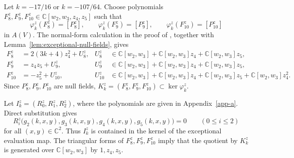 \documentclass[11 pt]{amsart}
\theoremstyle{definition}
\theoremstyle{plain}
\begin{document}
\medskip
Let $k=-17/16$ or $k=-107/64$.  Choose polynomials
$F_8^z,F_9^z,F_{10}^z\in\mathbb C[w_2,w_3,z_4,z_5]$ such that
\[
  \varphi_k^z(F_8^z)=[P_8^z],\qquad
  \varphi_k^z(F_9^z)=[P_9^z],\qquad
  \varphi_k^z(F_{10}^z)=[P_{10}^z]
\]
in $A(V)$.
The normal-form calculation in the proof of \cite[Lemma~2.6]{DLY},
together with Lemma~\ref{lem:exceptional-null-fields}, gives
\begin{align*}
F_8^z&=2(3k+4)z_4^2+U_8^z,
&U_8^z&\in
\mathbb C[w_2,w_3]+\mathbb C[w_2,w_3]z_4+
\mathbb C[w_2,w_3]z_5,\\
F_9^z&=z_4z_5+U_9^z,
&U_9^z&\in
\mathbb C[w_2,w_3]+\mathbb C[w_2,w_3]z_4+
\mathbb C[w_2,w_3]z_5,\\
F_{10}^z&=-z_5^2+U_{10}^z,
&U_{10}^z&\in
\mathbb C[w_2,w_3]+\mathbb C[w_2,w_3]z_4+
\mathbb C[w_2,w_3]z_5+\mathbb C[w_2,w_3]z_4^2.
\end{align*}
Since $P_8^z,P_9^z,P_{10}^z$ are null fields,
$K_k^z=(F_8^z,F_9^z,F_{10}^z)\subset\ker\varphi_k^z$.

Let $I_k^z=(R_0^z,R_1^z,R_2^z)$,
where the polynomials are given in Appendix~\ref{app-a}. Direct
substitution gives
\[
R_i^z\bigl(
g_2(k,x,y),g_3(k,x,y),g_4(k,x,y),g_5(k,x,y)
\bigr)=0
\qquad (0\leq i\leq2)
\]
for all $(x,y)\in\mathbb C^2$.  Thus $I_k^z$ is contained in the
kernel of the exceptional evaluation map. The triangular forms of
$F_8^z,F_9^z,F_{10}^z$ imply that the quotient by $K_k^z$ is generated
over $\mathbb C[w_2,w_3]$ by $1,z_4,z_5$.
\end{document}
